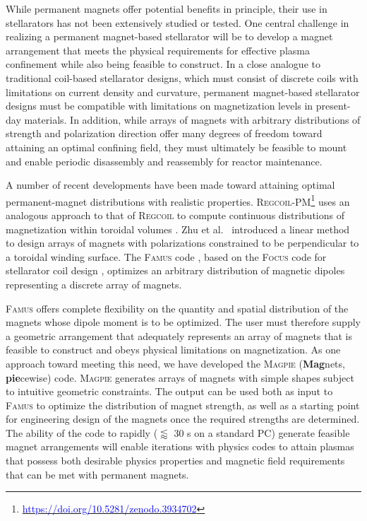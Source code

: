 \documentclass[11pt,onecolumn]{article}
\begin{document}
While permanent magnets offer potential benefits in principle, their use in
stellarators has not been extensively studied or tested.
One central challenge in realizing a permanent magnet-based stellarator will
be to develop a magnet arrangement that meets the physical requirements
for effective plasma confinement while also being feasible to construct.
In a close analogue to traditional coil-based stellarator designs, which 
must consist of discrete coils with limitations on current density and
curvature, permanent magnet-based stellarator designs must be compatible with 
limitations on magnetization levels in present-day materials. In addition, while
arrays of magnets with arbitrary distributions of strength and polarization
direction offer many degrees of freedom toward attaining an optimal confining
field, they must ultimately be feasible to mount and enable periodic 
disassembly and reassembly for reactor maintenance.

A number of recent developments have been made toward attaining optimal
permanent-magnet distributions with realistic properties. 
\textsc{Regcoil-PM}\footnote{\href{https://doi.org/10.5281/zenodo.3934702}
{\textcolor{blue}{https://doi.org/10.5281/zenodo.3934702}}} 
uses an analogous approach to that of \textsc{Regcoil}
to compute continuous distributions of magnetization within toroidal
volumes \cite{landreman2020a}. 
Zhu et al.~\cite{zhu2020a} introduced a linear
method to design arrays of magnets with polarizations constrained to be
perpendicular to a toroidal winding surface.
The \textsc{Famus} code \cite{zhu2020b}, based on the \textsc{Focus} 
code for stellarator coil design \cite{zhu2017a},
optimizes an arbitrary distribution
of magnetic dipoles representing a discrete array of magnets.

\textsc{Famus} offers complete flexibility on the quantity and spatial 
distribution of the magnets whose dipole moment is to be optimized. 
The user must 
therefore supply a geometric arrangement that adequately represents an array of 
magnets that is feasible to construct and obeys physical limitations on 
magnetization. As one approach toward meeting this need, we have developed the 
\textsc{Magpie} (\textbf{Mag}nets, \textbf{pie}cewise) code. 
\textsc{Magpie} generates arrays of magnets with simple shapes subject to
intuitive geometric constraints. The output can be used both as input to
\textsc{Famus} to optimize the distribution of magnet strength, as well as
a starting point for engineering design of the magnets once the required
strengths are determined.  
The ability of the code to rapidly ($\lessapprox$ 30 s on a standard
PC) generate feasible magnet arrangements will enable iterations with physics
codes to attain plasmas that possess both desirable physics properties 
and magnetic field requirements that can be met with permanent magnets.
\end{document}

